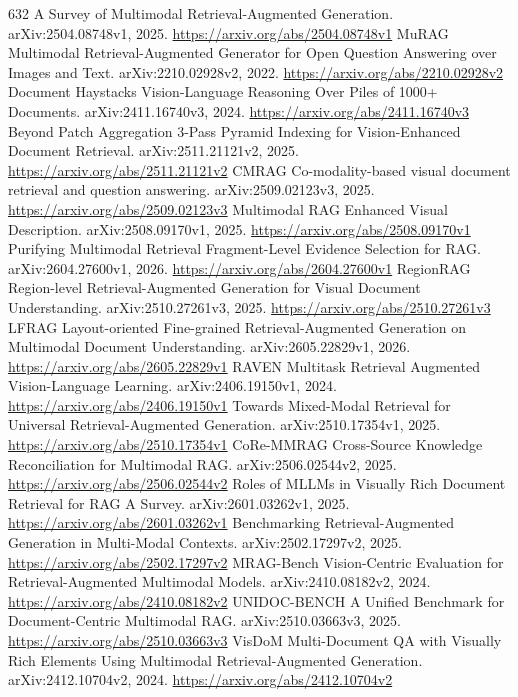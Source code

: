 \documentclass[11pt]{article}
\begin{document}
\begin{thebibliography}{632}
 A Survey of Multimodal Retrieval-Augmented Generation. arXiv:2504.08748v1, 2025. \url{https://arxiv.org/abs/2504.08748v1}
 MuRAG Multimodal Retrieval-Augmented Generator for Open Question Answering over Images and Text. arXiv:2210.02928v2, 2022. \url{https://arxiv.org/abs/2210.02928v2}
 Document Haystacks Vision-Language Reasoning Over Piles of 1000+ Documents. arXiv:2411.16740v3, 2024. \url{https://arxiv.org/abs/2411.16740v3}
 Beyond Patch Aggregation 3-Pass Pyramid Indexing for Vision-Enhanced Document Retrieval. arXiv:2511.21121v2, 2025. \url{https://arxiv.org/abs/2511.21121v2}
 CMRAG Co-modality-based visual document retrieval and question answering. arXiv:2509.02123v3, 2025. \url{https://arxiv.org/abs/2509.02123v3}
 Multimodal RAG Enhanced Visual Description. arXiv:2508.09170v1, 2025. \url{https://arxiv.org/abs/2508.09170v1}
 Purifying Multimodal Retrieval Fragment-Level Evidence Selection for RAG. arXiv:2604.27600v1, 2026. \url{https://arxiv.org/abs/2604.27600v1}
 RegionRAG Region-level Retrieval-Augmented Generation for Visual Document Understanding. arXiv:2510.27261v3, 2025. \url{https://arxiv.org/abs/2510.27261v3}
 LFRAG Layout-oriented Fine-grained Retrieval-Augmented Generation on Multimodal Document Understanding. arXiv:2605.22829v1, 2026. \url{https://arxiv.org/abs/2605.22829v1}
 RAVEN Multitask Retrieval Augmented Vision-Language Learning. arXiv:2406.19150v1, 2024. \url{https://arxiv.org/abs/2406.19150v1}
 Towards Mixed-Modal Retrieval for Universal Retrieval-Augmented Generation. arXiv:2510.17354v1, 2025. \url{https://arxiv.org/abs/2510.17354v1}
 CoRe-MMRAG Cross-Source Knowledge Reconciliation for Multimodal RAG. arXiv:2506.02544v2, 2025. \url{https://arxiv.org/abs/2506.02544v2}
 Roles of MLLMs in Visually Rich Document Retrieval for RAG A Survey. arXiv:2601.03262v1, 2025. \url{https://arxiv.org/abs/2601.03262v1}
 Benchmarking Retrieval-Augmented Generation in Multi-Modal Contexts. arXiv:2502.17297v2, 2025. \url{https://arxiv.org/abs/2502.17297v2}
 MRAG-Bench Vision-Centric Evaluation for Retrieval-Augmented Multimodal Models. arXiv:2410.08182v2, 2024. \url{https://arxiv.org/abs/2410.08182v2}
 UNIDOC-BENCH A Unified Benchmark for Document-Centric Multimodal RAG. arXiv:2510.03663v3, 2025. \url{https://arxiv.org/abs/2510.03663v3}
 VisDoM Multi-Document QA with Visually Rich Elements Using Multimodal Retrieval-Augmented Generation. arXiv:2412.10704v2, 2024. \url{https://arxiv.org/abs/2412.10704v2}

\end{thebibliography}
\end{document}
